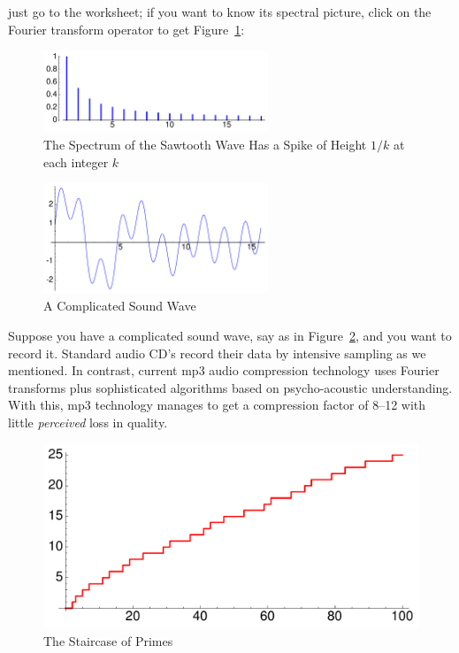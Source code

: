 \documentclass[11pt]{article}
\theoremstyle{plain}
\theoremstyle{definition}
\numberwithin{equation}{section}
\numberwithin{figure}{section}
\numberwithin{table}{section}
\begin{document}
\noindent just go to the worksheet; if you want to know its spectral picture, click on the Fourier transform operator to get Figure~\ref{fig:sawtooth-spectrum}:
    
 \bigskip


\begin{figure}[H]
\begin{center}
\includegraphics[width=0.6\textwidth]{illustrations/sawtooth-spectrum}
\end{center}
\caption{The Spectrum of the Sawtooth Wave Has a Spike of Height $1/k$ at 
each integer $k$\label{fig:sawtooth-spectrum}}
\end{figure}
  

       
\begin{figure}[H]
\begin{center}
\includegraphics[width=0.6\textwidth]{illustrations/complicated-wave}
\end{center}
\caption{A Complicated Sound Wave\label{fig:complicated-wave}}
\end{figure}
Suppose you have a complicated sound wave, say as in
Figure~\ref{fig:complicated-wave}, and you want to record it.
Standard audio CD's record their data by intensive sampling as we
mentioned. In contrast, current mp3 audio compression technology uses
Fourier transforms plus sophisticated algorithms based on
psycho-acoustic understanding. With this, mp3 technology manages to
get a compression factor of 8--12 with little {\em perceived} loss in
quality.
 
\begin{figure}[H]
\begin{center}
\includegraphics[width=.35\textwidth]{illustrations/PN_100}
\caption{The Staircase of Primes\label{fig:staircase100}}
\end{center}
\end{figure}
\end{document}
